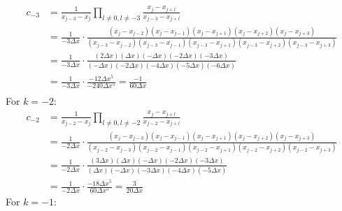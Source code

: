 \begin{equation}
	\begin{aligned}
		c_{-3} & = \frac{1}{x_{j-3} - x_j} \prod_{l \neq 0, l \neq -3} \frac{x_j - x_{j+l}}{x_{j-3} - x_{j+l}}                                                                                                                    \\
		       & = \frac{1}{-3\Delta x} \cdot \frac{(x_j - x_{j-2})(x_j - x_{j-1})(x_j - x_{j+1})(x_j - x_{j+2})(x_j - x_{j+3})}{(x_{j-3} - x_{j-2})(x_{j-3} - x_{j-1})(x_{j-3} - x_{j+1})(x_{j-3} - x_{j+2})(x_{j-3} - x_{j+3})} \\
		       & = \frac{1}{-3\Delta x} \cdot \frac{(2\Delta x)(\Delta x)(-\Delta x)(-2\Delta x)(-3\Delta x)}{(-\Delta x)(-2\Delta x)(-4\Delta x)(-5\Delta x)(-6\Delta x)}                                                         \\
		       & = \frac{1}{-3\Delta x} \cdot \frac{-12 \Delta x^5}{-240 \Delta x^5} = \frac{-1}{60\Delta x}                                                                                                                        \\
	\end{aligned}
\end{equation}
For $k=-2$:
\begin{equation}
	\begin{aligned}
		c_{-2} & = \frac{1}{x_{j-2} - x_j} \prod_{l \neq 0, l \neq -2} \frac{x_j - x_{j+l}}{x_{j-2} - x_{j+l}}                                                                                                                    \\
		       & = \frac{1}{-2\Delta x} \cdot \frac{(x_j - x_{j-3})(x_j - x_{j-1})(x_j - x_{j+1})(x_j - x_{j+2})(x_j - x_{j+3})}{(x_{j-2} - x_{j-3})(x_{j-2} - x_{j-1})(x_{j-2} - x_{j+1})(x_{j-2} - x_{j+2})(x_{j-2} - x_{j+3})} \\
		       & =  \frac{1}{-2\Delta x} \cdot \frac{(3\Delta x)(\Delta x)(-\Delta x)(-2\Delta x)(-3\Delta x)}{(\Delta x)(-\Delta x)(-3\Delta x)(-4\Delta x)(-5\Delta x)}                                                           \\
		       & = \frac{1}{-2\Delta x} \cdot \frac{-18\Delta x^5}{60 \Delta x^5} = \frac{3}{20\Delta x}
	\end{aligned}
\end{equation}
For $k=-1$:
